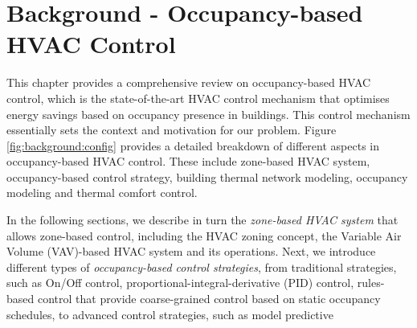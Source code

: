 \chapter{Background - Occupancy-based HVAC Control}
\label{cha:background}









This chapter provides a comprehensive review on occupancy-based HVAC control, which is the state-of-the-art HVAC control mechanism that optimises energy savings based on occupancy presence in buildings. This control mechanism essentially sets the context and motivation for our problem. Figure \ref{fig:background:config} provides a detailed breakdown of different aspects in occupancy-based HVAC control. These include zone-based HVAC system, occupancy-based control strategy, building thermal network modeling, occupancy modeling and thermal comfort control.

In the following sections, we describe in turn the \emph{zone-based HVAC system} that allows zone-based control, including the HVAC zoning concept, the Variable Air Volume (VAV)-based HVAC system and its operations. Next, we introduce different types of \emph{occupancy-based control strategies}, from traditional strategies, such as On/Off control, proportional-integral-derivative (PID) control, rules-based control that provide coarse-grained control based on static occupancy schedules, to advanced control strategies, such as model predictive  

